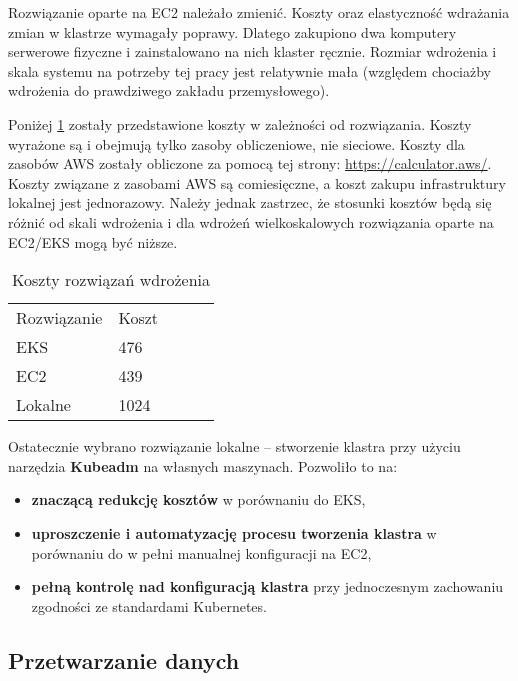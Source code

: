 Rozwiązanie oparte na EC2 należało zmienić. Koszty oraz elastyczność wdrażania zmian w klastrze wymagały poprawy. Dlatego zakupiono dwa komputery serwerowe fizyczne i zainstalowano na nich klaster ręcznie. Rozmiar wdrożenia i skala systemu na potrzeby tej pracy jest relatywnie mała (względem chociażby wdrożenia do prawdziwego zakładu przemysłowego).

Poniżej \ref{tab:koszty_rozwiazan_wdrazenia} zostały przedstawione koszty w zależności od rozwiązania. Koszty wyrażone są i obejmują tylko zasoby obliczeniowe, nie sieciowe. Koszty dla zasobów AWS zostały obliczone za pomocą tej strony: \url{https://calculator.aws/}. Koszty związane z zasobami AWS są comiesięczne, a koszt zakupu infrastruktury lokalnej jest jednorazowy. Należy jednak zastrzec, że stosunki kosztów będą się różnić od skali wdrożenia i dla wdrożeń wielkoskalowych rozwiązania oparte na EC2/EKS mogą być niższe.

\begin{table}[h]
    \centering
    \begin{tabular}{|l|l|lll}
    \cline{1-2}
    Rozwiązanie & Koszt &  &  &  \\ \cline{1-2}
    EKS         & 476   &  &  &  \\ \cline{1-2}
    EC2         & 439   &  &  &  \\ \cline{1-2}
    Lokalne     & 1024  &  &  &  \\ \cline{1-2}
    \end{tabular}
    \caption{Koszty rozwiązań wdrożenia}
    \label{tab:koszty_rozwiazan_wdrazenia}
\end{table}

\vspace{0.3em}

Ostatecznie wybrano rozwiązanie lokalne – stworzenie klastra przy użyciu narzędzia \textbf{Kubeadm} na własnych maszynach. Pozwoliło to na:
\begin{itemize}
    \item \textbf{znaczącą redukcję kosztów} w porównaniu do EKS,
    \item \textbf{uproszczenie i automatyzację procesu tworzenia klastra} w porównaniu do w pełni manualnej konfiguracji na EC2,
    \item \textbf{pełną kontrolę nad konfiguracją klastra} przy jednoczesnym zachowaniu zgodności ze standardami Kubernetes.
\end{itemize}

\subsection{Przetwarzanie danych}

